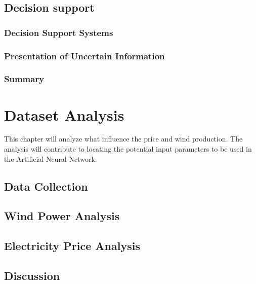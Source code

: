 \documentclass[twoside,11pt,openright]{report}
\begin{document}
\newpage

\section{Decision support}
\subsection{Decision Support Systems}

\subsection{Presentation of Uncertain Information}
\label{sec:uncertainInformation}

\subsection{Summary}



\chapter{Dataset Analysis}
This chapter will analyze what influence the price and wind production. The analysis will contribute to locating the potential input parameters to be used in the Artificial Neural Network. 
\label{ch:theANNs}
\section{Data Collection}
\label{sec:dataCollection}

\section{Wind Power Analysis}
\label{sec:windPowerAnalysis}

\section{Electricity Price Analysis}

\section{Discussion}

\end{document}
